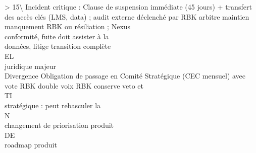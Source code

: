 \textgreater{} 15\textbackslash{}%
Incident critique :   Clause de suspension immédiate (45 jours) + transfert des accès clés (LMS, data) ; audit externe déclenché par RBK arbitre maintien\\
manquement            RBK                                                                                                            ou résiliation ; Nexus\\
conformité, fuite                                                                                                                    doit assister à la\\
données, litige                                                                                                                      transition complète\\
\vspace{0.5em}
\vspace{0.5em}
\vspace{0.5em}
\vspace{0.5em}
EL\\
juridique majeur\\
Divergence            Obligation de passage en Comité Stratégique (CEC mensuel) avec vote RBK double voix                            RBK conserve veto et\\
\vspace{0.5em}
\vspace{0.5em}
\vspace{0.5em}
\vspace{0.5em}
TI\\
stratégique :                                                                                                                        peut rebasculer la\\
\vspace{0.5em}
\vspace{0.5em}
\vspace{0.5em}
\vspace{0.5em}
N\\
changement de                                                                                                                        priorisation produit\\
\vspace{0.5em}
\vspace{0.5em}
\vspace{0.5em}
\vspace{0.5em}
DE\\
roadmap produit\\
